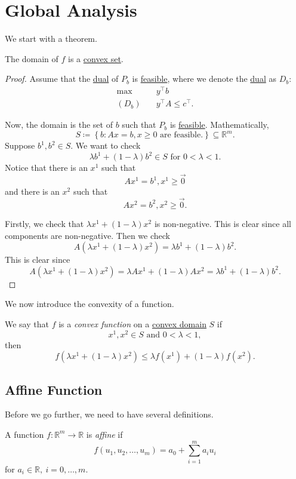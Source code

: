 \section{Global Analysis}
We start with a theorem.
\begin{theorem}\label{thm:lec14-1}
	The domain of \(f\) is a \hyperref[def:convex-set]{convex set}.
\end{theorem}
\begin{proof}
	Assume that the \hyperref[def:dual]{dual} of \(P_b\) is \hyperref[def:feasible-solution]{feasible}, where we denote the \hyperref[def:dual]{dual} as \(D_b\):
	\[
		\begin{aligned}
			\max~      & y^{\top}b               \\
			(D_b)\quad & y^{\top}A\leq c^{\top}.
		\end{aligned}
	\]

	Now, the domain is the set of \(b\) such that \(P_b\) is \hyperref[def:feasible-solution]{feasible}. Mathematically,
	\[
		S\coloneqq \left\{ b\colon Ax = b, x\geq 0 \text{ are feasible.}\right\}\subseteq \mathbb{R}^m.
	\]
	Suppose \(b^1, b^2\in S\). We want to check
	\[
		\lambda b^{1}+(1-\lambda) b^2 \in S\text{ for }0<\lambda<1.
	\]
	Notice that there is an \(x^1\) such that
	\[
		Ax^1 = b^1, x^1\geq \vec{0}
	\]
	and there is an \(x^2\) such that
	\[
		Ax^2 = b^2, x^2\geq \vec{0}.
	\]

	Firstly, we check that \(\lambda x^{1}+(1 - \lambda)x^2\) is non-negative. This is clear since all components are non-negative. Then we check
	\[
		A(\lambda x^{1}+(1 - \lambda)x^2) = \lambda b^1 + (1 - \lambda)b^2.
	\]
	This is clear since
	\[
		A(\lambda x^{1}+(1 - \lambda)x^2) = \lambda Ax^1 + (1 - \lambda)Ax^2 = \lambda b^1 + (1-\lambda)b^2.
	\]
\end{proof}

We now introduce the convexity of a function.
\begin{definition}\label{def:convex-function}
	We say that \(f\) is a \emph{convex function} on a \hyperref[def:convex-set]{convex domain} \(S\) if
	\[
		x^1, x^2\in S\text{ and }0<\lambda<1,
	\]
	then
	\[
		f(\lambda x^1+(1 - \lambda)x^2)\leq \lambda f(x^1)+(1-\lambda)f(x^2).
	\]
	\begin{center}
	\end{center}
\end{definition}

\subsection{Affine Function}
Before we go further, we need to have several definitions.
\begin{definition}\label{def:affine-function}
	A function \(f\colon \mathbb{R}^{m}\to \mathbb{R}\) is \emph{affine} if
	\[
		f(u_1, u_2, \ldots , u_m) = a_0 + \sum\limits_{i=1}^{m} a_{i}u_{i}
	\]
	for \(a_i \in\mathbb{R},\ i = 0, \ldots , m\).
\end{definition}

